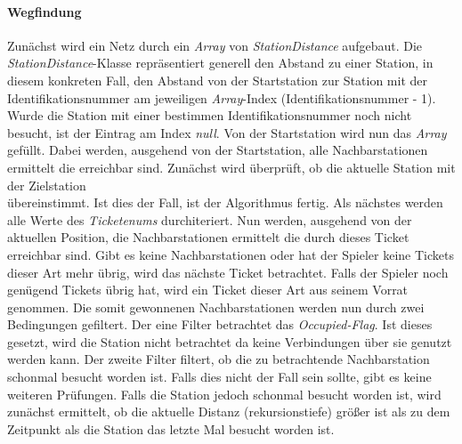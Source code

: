                 \paragraph{Wegfindung}
                    Zunächst wird ein Netz durch ein \textit{Array} von \textit{StationDistance} aufgebaut.
                    Die \textit{StationDistance}-Klasse repräsentiert generell den Abstand zu einer Station,
                    in diesem konkreten Fall, den Abstand von der Startstation zur Station mit der Identifikationsnummer am jeweiligen \textit{Array}-Index (Identifikationsnummer - 1).
                    Wurde die Station mit einer bestimmen Identifikationsnummer noch nicht besucht, ist der Eintrag am Index \textit{null}.
                    \newline
                    \newline
                    Von der Startstation wird nun das \textit{Array} gefüllt.
                    Dabei werden, ausgehend von der Startstation, alle Nachbarstationen ermittelt die erreichbar sind.
                    \newline
                    Zunächst wird überprüft, ob die aktuelle Station mit der Zielstation\\übereinstimmt.
                    Ist dies der Fall, ist der Algorithmus fertig.
                    Als nächstes werden alle Werte des \textit{Ticketenums} durchiteriert.
                    Nun werden, ausgehend von der aktuellen Position, die Nachbarstationen ermittelt die durch dieses Ticket erreichbar sind.
                    Gibt es keine Nachbarstationen oder hat der Spieler keine Tickets dieser Art mehr übrig, wird das nächste Ticket betrachtet.
                    Falls der Spieler noch genügend Tickets übrig hat, wird ein Ticket dieser Art aus seinem Vorrat genommen.
                    Die somit gewonnenen Nachbarstationen werden nun durch zwei Bedingungen gefiltert.
                    Der eine Filter betrachtet das \textit{Occupied-Flag}.
                    Ist dieses gesetzt, wird die Station nicht betrachtet da keine Verbindungen über sie genutzt werden kann.
                    Der zweite Filter filtert, ob die zu betrachtende Nachbarstation schonmal besucht worden ist.
                    Falls dies nicht der Fall sein sollte, gibt es keine weiteren Prüfungen.
                    Falls die Station jedoch schonmal besucht worden ist,
                    wird zunächst ermittelt, ob die aktuelle Distanz (rekursionstiefe) größer ist als zu dem Zeitpunkt als die Station das letzte Mal
                    besucht worden ist.
